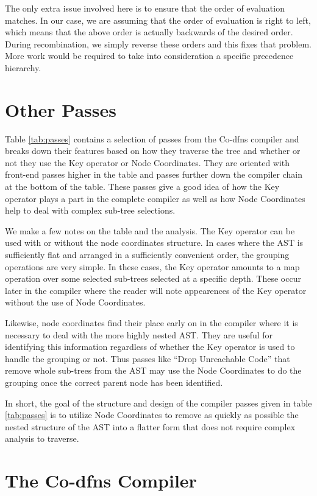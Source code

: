 \documentclass[numbers,preprint]{sigplanconf}
\begin{document}
The only extra issue involved here is to ensure that the order of
evaluation matches. In our case, we are assuming that the order of
evaluation is right to left, which means that the above order is
actually backwards of the desired order. During recombination, we
simply reverse these orders and this fixes that problem. More work
would be required to take into consideration a specific precedence
hierarchy.

\section{Other Passes}

Table \ref{tab:passes} contains a selection of passes from the
Co-dfns compiler and breaks down their features based on how they
traverse the tree and whether or not they use the Key operator or
Node Coordinates. They are oriented with front-end passes higher in
the table and passes further down the compiler chain at the bottom
of the table. These passes give a good idea of how the Key operator
plays a part in the complete compiler as well as how Node Coordinates
help to deal with complex sub-tree selections.

We make a few notes on the table and the analysis. The Key operator
can be used with or without the node coordinates structure. In cases
where the AST is sufficiently flat and arranged in a sufficiently
convenient order, the grouping operations are very simple. In these
cases, the Key operator amounts to a map operation over some selected
sub-trees selected at a specific depth. These occur later in the
compiler where the reader will note appearences of the Key operator
without the use of Node Coordinates.

Likewise, node coordinates find their place early on in the compiler
where it is necessary to deal with the more highly nested AST. They
are useful for identifying this information regardless of whether the
Key operator is used to handle the grouping or not. Thus passes like
``Drop Unreachable Code'' that remove whole sub-trees from the AST
may use the Node Coordinates to do the grouping once the correct
parent node has been identified.

In short, the goal of the structure and design of the compiler passes
given in table \ref{tab:passes} is to utilize Node Coordinates to
remove as quickly as possible the nested structure of the AST into
a flatter form that does not require complex analysis to traverse.

\section{The Co-dfns Compiler}
\end{document}
